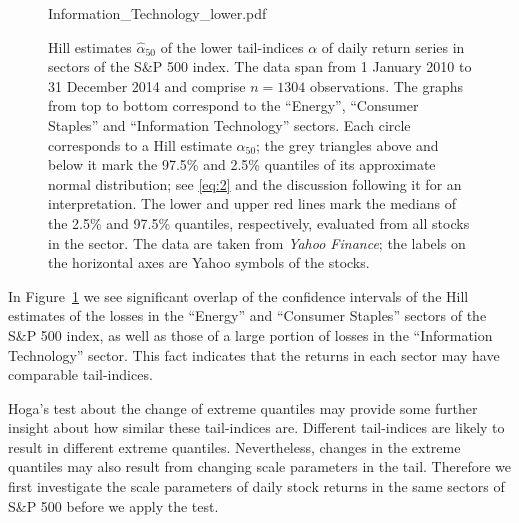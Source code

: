 \documentclass[11pt,a4]{amsart}
\newcommand{\1}{{\mathbf 1}}
\begin{document}
\begin{figure}[htb!]
\begin{minipage}{1.0\linewidth}
    {Information_Technology_lower.pdf}
  \end{minipage}
  \caption{\small Hill estimates $\hat \alpha_{50}$ of the lower tail-indices $\alpha$ of
    daily return series in sectors of the S\&P 500
    index. The data span
    from 1 January 2010 to 31 December 2014 and comprise $n=1304$ observations.
The graphs from top to bottom correspond to the ``Energy'',
    ``Consumer Staples'' and ``Information Technology'' sectors.
    Each circle corresponds to a Hill estimate $\hat\alpha_{50}$; the grey
    triangles above and below it mark the 97.5\% and 2.5\% quantiles
    of its approximate normal distribution; see \eqref{eq:2} and the discussion following it for an 
interpretation.
    The lower and upper red lines mark the medians of the 2.5\% 
    and 97.5\% quantiles, respectively, evaluated from all stocks in the sector.
    The data are taken from {\it Yahoo Finance}; the labels on
    the horizontal axes are Yahoo symbols of the stocks. 
  }\label{fig:1}
\end{figure}

In Figure~\ref{fig:1} we see significant overlap of the confidence intervals of the Hill
estimates of the losses in the ``Energy'' and ``Consumer Staples''
sectors of the S\&P 500 index, as well as those of a 
large portion of losses in the ``Information Technology'' sector.
This fact indicates that the returns in each sector may 
have comparable tail-indices.
\par
Hoga's \cite{hoga:2016} test about the change of extreme quantiles
may provide some further insight about how similar these tail-indices are.
Different tail-indices are likely to result in different
extreme quantiles. Nevertheless, changes in the extreme quantiles may also
result from changing scale parameters in the tail. Therefore  we first investigate the scale
parameters of daily stock returns in the same sectors of S\&P 500 before we apply the test.
\end{document}
